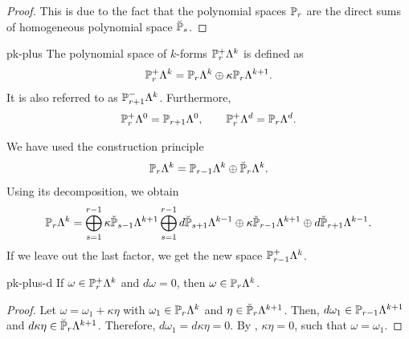 \begin{proof}
  This is due to the fact that the polynomial spaces $\P_r$ are the
  direct sums of homogeneous polynomial space $\breve\P_s$.
\end{proof}

\begin{Definition}{pk-plus}
  The polynomial space of $k$-forms $\P_r^+\Lambda^k$ is defined as
  \begin{gather}
    \P_r^+\Lambda^k = \P_r\Lambda^k \oplus \kappa \P_r\Lambda^{k+1}.
  \end{gather}
  It is also referred to as $\P_{r+1}^-\Lambda^k$. Furthermore,
  \begin{gather*}
    \P_r^+\Lambda^0 = \P_{r+1}\Lambda^0,
    \qquad
    \P_r^+\Lambda^d = \P_r\Lambda^d.
  \end{gather*}
\end{Definition}

\begin{remark}
  We have used the construction principle
  \begin{gather*}
    \P_r\Lambda^k = \P_{r-1}\Lambda^k \oplus \breve \P_r\Lambda^k.
  \end{gather*}
  Using its decomposition, we obtain
  \begin{gather*}
    \P_r\Lambda^k =
    \bigoplus_{s=1}^{r-1}\kappa \breve\P_{s-1}\Lambda^{k+1}
    \bigoplus_{s=1}^{r-1} d\breve\P_{s+1}\Lambda^{k-1}
    \oplus \kappa \breve\P_{r-1}\Lambda^{k+1}
    \oplus d\breve\P_{r+1}\Lambda^{k-1}.
  \end{gather*}
  If we leave out the last factor, we get the new space
  $\P_{r-1}^+\Lambda^k$.
\end{remark}

\begin{Lemma}{pk-plus-d}
  If $\omega\in \P_r^+\Lambda^k$ and $d\omega=0$, then
  $\omega\in\P_r\Lambda^k$.
\end{Lemma}

\begin{proof}
  Let $\omega = \omega_1 + \kappa\eta$ with $\omega_1\in\P_r\Lambda^k$
  and $\eta\in \breve\P_r\Lambda^{k+1}$. Then,
  $d\omega_1\in\P_{r-1}\Lambda^{k+1}$ and
  $d\kappa\eta\in \breve\P_r\Lambda^{k+1}$. Therefore,
  $d\omega_1 = d\kappa\eta = 0$. By
  , $\kappa\eta=0$, such that
  $\omega=\omega_1$.
\end{proof}

